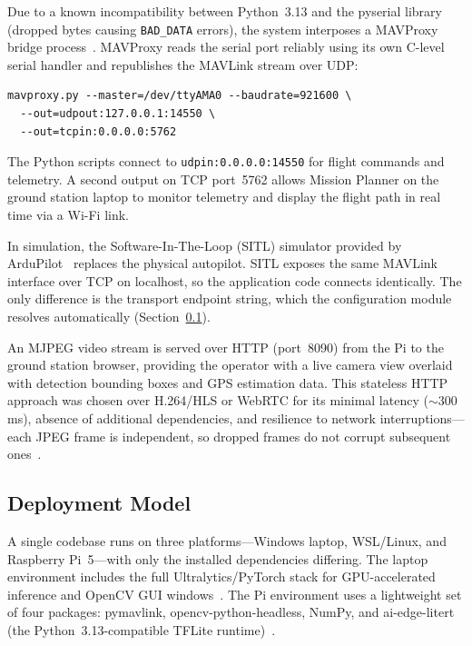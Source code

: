 Due to a known incompatibility between Python~3.13 and the pyserial library (dropped bytes causing \texttt{BAD\_DATA} errors), the system interposes a MAVProxy bridge process~\cite{mavproxy}. MAVProxy reads the serial port reliably using its own C-level serial handler and republishes the MAVLink stream over UDP:

\begin{verbatim}
mavproxy.py --master=/dev/ttyAMA0 --baudrate=921600 \
  --out=udpout:127.0.0.1:14550 \
  --out=tcpin:0.0.0.0:5762
\end{verbatim}

The Python scripts connect to \texttt{udpin:0.0.0.0:14550} for flight commands and telemetry. A second output on TCP port~5762 allows Mission Planner on the ground station laptop to monitor telemetry and display the flight path in real time via a Wi-Fi link.

In simulation, the Software-In-The-Loop (SITL) simulator provided by ArduPilot~\cite{ardupilot} replaces the physical autopilot. SITL exposes the same MAVLink interface over TCP on localhost, so the application code connects identically. The only difference is the transport endpoint string, which the configuration module resolves automatically (Section~\ref{sec:arch-deployment}).

An MJPEG video stream is served over HTTP (port~8090) from the Pi to the ground station browser, providing the operator with a live camera view overlaid with detection bounding boxes and GPS estimation data. This stateless HTTP approach was chosen over H.264/HLS or WebRTC for its minimal latency (${\sim}300$\,ms), absence of additional dependencies, and resilience to network interruptions---each JPEG frame is independent, so dropped frames do not corrupt subsequent ones~\cite{munoz2016mjpeg}.

\subsection{Deployment Model}\label{sec:arch-deployment}

A single codebase runs on three platforms---Windows laptop, WSL/Linux, and Raspberry Pi~5---with only the installed dependencies differing. The laptop environment includes the full Ultralytics/PyTorch stack for GPU-accelerated inference and OpenCV GUI windows~\cite{opencv}. The Pi environment uses a lightweight set of four packages: pymavlink, opencv-python-headless, NumPy, and ai-edge-litert (the Python~3.13-compatible TFLite runtime)~\cite{raspberrypi5}.

